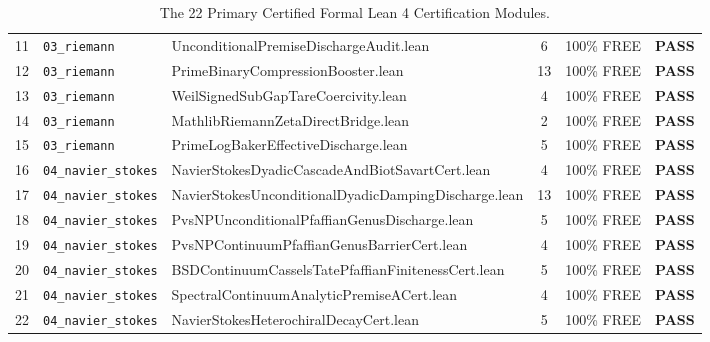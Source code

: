 \documentclass[11pt,a4paper]{article}
\begin{document}
\begin{table}[h!]
\begin{tabularx}{\textwidth}{cllccc}
11 & \texttt{03\_riemann} & {\scriptsize\ttfamily Unconditional\allowbreak Premise\allowbreak Discharge\allowbreak Audit.lean} & 6 & 100\% FREE & \textbf{PASS} \\
12 & \texttt{03\_riemann} & {\scriptsize\ttfamily Prime\allowbreak Binary\allowbreak Compression\allowbreak Booster.lean} & 13 & 100\% FREE & \textbf{PASS} \\
13 & \texttt{03\_riemann} & {\scriptsize\ttfamily Weil\allowbreak Signed\allowbreak Sub\allowbreak Gap\allowbreak Tare\allowbreak Coercivity.lean} & 4 & 100\% FREE & \textbf{PASS} \\
14 & \texttt{03\_riemann} & {\scriptsize\ttfamily Mathlib\allowbreak Riemann\allowbreak Zeta\allowbreak Direct\allowbreak Bridge.lean} & 2 & 100\% FREE & \textbf{PASS} \\
15 & \texttt{03\_riemann} & {\scriptsize\ttfamily Prime\allowbreak Log\allowbreak Baker\allowbreak Effective\allowbreak Discharge.lean} & 5 & 100\% FREE & \textbf{PASS} \\
16 & \texttt{04\_navier\_stokes} & {\scriptsize\ttfamily Navier\allowbreak Stokes\allowbreak Dyadic\allowbreak Cascade\allowbreak And\allowbreak Biot\allowbreak Savart\allowbreak Cert.lean} & 4 & 100\% FREE & \textbf{PASS} \\
17 & \texttt{04\_navier\_stokes} & {\scriptsize\ttfamily Navier\allowbreak Stokes\allowbreak Unconditional\allowbreak Dyadic\allowbreak Damping\allowbreak Discharge.lean} & 13 & 100\% FREE & \textbf{PASS} \\
18 & \texttt{04\_navier\_stokes} & {\scriptsize\ttfamily Pvs\allowbreak NPUnconditional\allowbreak Pfaffian\allowbreak Genus\allowbreak Discharge.lean} & 5 & 100\% FREE & \textbf{PASS} \\
19 & \texttt{04\_navier\_stokes} & {\scriptsize\ttfamily Pvs\allowbreak NPContinuum\allowbreak Pfaffian\allowbreak Genus\allowbreak Barrier\allowbreak Cert.lean} & 4 & 100\% FREE & \textbf{PASS} \\
20 & \texttt{04\_navier\_stokes} & {\scriptsize\ttfamily BSDContinuum\allowbreak Cassels\allowbreak Tate\allowbreak Pfaffian\allowbreak Finiteness\allowbreak Cert.lean} & 5 & 100\% FREE & \textbf{PASS} \\
21 & \texttt{04\_navier\_stokes} & {\scriptsize\ttfamily Spectral\allowbreak Continuum\allowbreak Analytic\allowbreak Premise\allowbreak ACert.lean} & 4 & 100\% FREE & \textbf{PASS} \\
22 & \texttt{04\_navier\_stokes} & {\scriptsize\ttfamily Navier\allowbreak Stokes\allowbreak Heterochiral\allowbreak Decay\allowbreak Cert.lean} & 5 & 100\% FREE & \textbf{PASS} \\
\bottomrule
\end{tabularx}
\caption{The 22 Primary Certified Formal Lean 4 Certification Modules.}
\label{tab:module_ledger}
\end{table}
\end{document}
